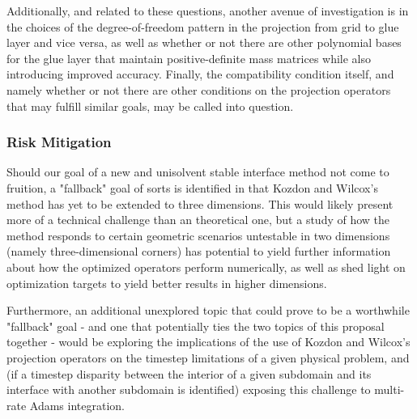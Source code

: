 Additionally, and related to these questions, another avenue of investigation
is in the choices of the degree-of-freedom pattern in the projection from
grid to glue layer and vice versa, as well as whether or not there are other
polynomial bases for the glue layer that maintain positive-definite mass
matrices while also introducing improved accuracy. Finally, the compatibility
condition itself, and namely whether or not there are other conditions on the
projection operators that may fulfill similar goals, may be called into question.

\subsubsection{Risk Mitigation}

Should our goal of a new and unisolvent stable interface method not come to
fruition, a "fallback" goal of sorts is identified in that Kozdon and Wilcox's
method has yet to be extended to three dimensions. This would likely present more of a
technical challenge than an theoretical one, but a study of how the method
responds to certain geometric scenarios untestable in two dimensions (namely
three-dimensional corners) has potential to yield further information about
how the optimized operators perform numerically, as well as shed light on
optimization targets to yield better results in higher dimensions.

Furthermore, an additional unexplored topic that could prove to be a worthwhile
"fallback" goal - and one that potentially ties the two topics of this proposal
together - would be exploring the implications of the use of Kozdon and Wilcox's
projection operators on the timestep limitations of a given physical problem, and
(if a timestep disparity between the interior of a given subdomain and its interface
with another subdomain is identified) exposing this challenge to multi-rate Adams
integration.

